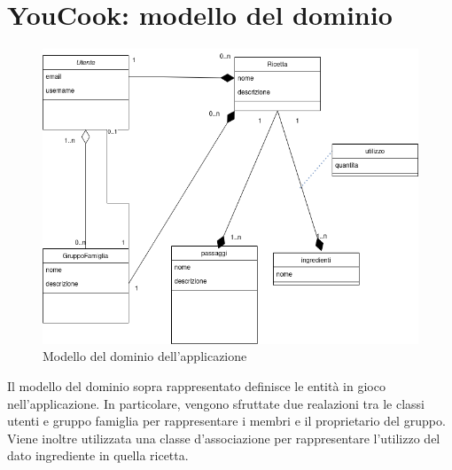 \section{YouCook: modello del dominio}
\begin{figure}[H]
    \centering
 \includegraphics[scale=0.7]{resources/modello_del_dominio.drawio.png}
   \caption{Modello del dominio dell'applicazione}
\end{figure}
Il modello del dominio sopra rappresentato definisce le entità in gioco nell'applicazione. In particolare, vengono sfruttate due realazioni tra le classi utenti e gruppo famiglia per rappresentare i membri e il proprietario del gruppo. Viene inoltre utilizzata una classe d'associazione per rappresentare l'utilizzo del dato ingrediente in quella ricetta.